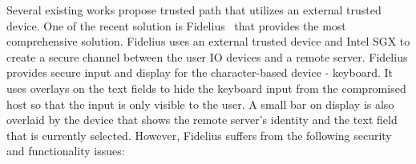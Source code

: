  Several existing works propose trusted path that utilizes an external trusted device. One of the recent solution is Fidelius~\cite{Fidelius} that provides the most comprehensive solution. Fidelius uses an external trusted device and Intel SGX to create a secure channel between the user IO devices and a remote server. Fidelius provides secure input and display for the character-based device - keyboard. It uses overlays on the text fields to hide the keyboard input from the compromised host so that the input is only visible to the user. A small bar on display is also overlaid by the device that shows the remote server's identity and the text field that is currently selected. However, Fidelius suffers from the following security and functionality issues: 
\vspace{-0.5em}
